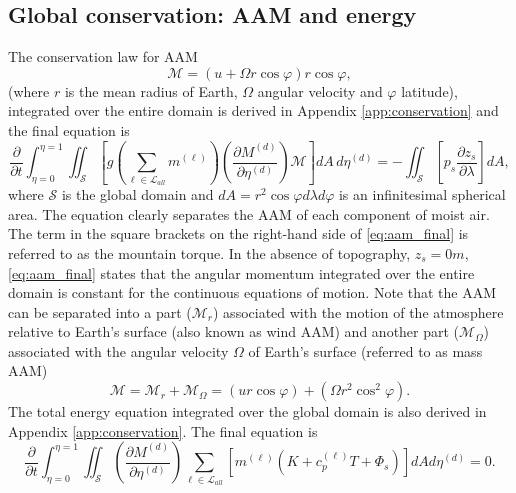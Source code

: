 \documentclass{agujournal}
\begin{document}
{\subsection{Global conservation: AAM and energy}\label{sec:aam}
The conservation law for AAM
\begin{equation}
\mathcal{M}=\left( u+\Omega r \cos \varphi \right) r \cos \varphi,
\end{equation}
(where $r$ is the mean radius of Earth, $\Omega$ angular velocity and $\varphi$ latitude), integrated over the entire domain is derived in Appendix \ref{app:conservation} and the final equation is
\begin{equation}
\frac{\partial}{\partial t}\int_{\eta=0}^{\eta=1}\iint_{\mathcal{S}}\left[ g\left( \sum_{\ell \in \mathcal{L}_{all}} m^{(\ell)}\right) \left( \frac{\partial M^{(d)}}{\partial \eta^{(d)}} \right) \mathcal{M} \right] dA\, d\eta^{(d)}=-\iint_{\mathcal{S}}\left[ p_s \frac{\partial z_s}{\partial \lambda}\right] dA,\label{eq:aam_final}
\end{equation}
where $\mathcal{S}$ is the global domain and $dA=r^2\cos\varphi d\lambda d\varphi$ is an infinitesimal spherical area. The equation clearly separates the AAM of each component of moist air. The term in the square brackets on the right-hand side of \eqref{eq:aam_final} is referred to as the mountain torque. In the absence of topography, $z_s=0m$, \eqref{eq:aam_final} states that the angular momentum integrated over the entire domain is constant for the continuous equations of motion. Note that the AAM can be separated into a part ($\mathcal{M}_r$) associated with the motion of the atmosphere relative to Earth's surface (also known as wind AAM) and another part ($\mathcal{M}_{\Omega}$) associated with the angular velocity $\Omega$ of Earth's surface (referred to as mass AAM)
\begin{equation}
\mathcal{M}=\mathcal{M}_r+\mathcal{M}_\Omega=\left( u r \cos \varphi\right)+\left(\Omega r^2 \cos^2 \varphi \right) .
\end{equation}
The total energy equation integrated over the global domain is also derived in Appendix \ref{app:conservation}. The final equation is
\begin{equation}
\frac{\partial }{\partial t}\int_{\eta=0}^{\eta=1} \iint_\mathcal{S} \left( \frac{\partial M^{(d)}}{\partial \eta^{(d)}} \right)\sum_{\ell \in \mathcal{L}_{all}} \left[m^{(\ell)} \left(K+c_p^{(\ell)}T+\Phi_s  \right)\right]  dA d \eta^{(d)}=0.\label{eq:comprehensice_energy}
\end{equation}
}
\end{document}
